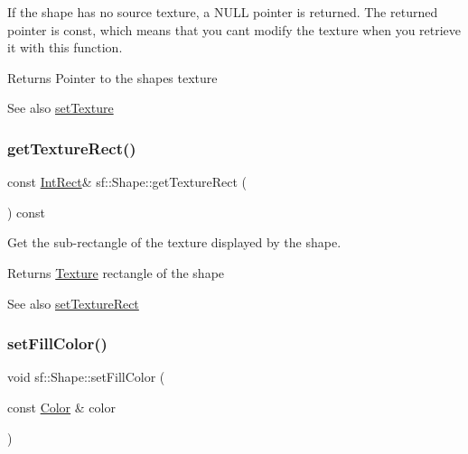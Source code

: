 If the shape has no source texture, a N\+U\+LL pointer is returned. The returned pointer is const, which means that you can\textquotesingle{}t modify the texture when you retrieve it with this function.

\begin{DoxyReturn}{Returns}
Pointer to the shape\textquotesingle{}s texture
\end{DoxyReturn}
\begin{DoxySeeAlso}{See also}
\hyperlink{classsf_1_1_shape_af8fb22bab1956325be5d62282711e3b6}{set\+Texture} 
\end{DoxySeeAlso}
\mbox{\label{classsf_1_1_shape_ac878aab03c230dc31c44e250d092b9ea}} 
\subsubsection{\texorpdfstring{get\+Texture\+Rect()}{getTextureRect()}}
{\footnotesize\ttfamily const \hyperlink{classsf_1_1_rect}{Int\+Rect}\& sf\+::\+Shape\+::get\+Texture\+Rect (\begin{DoxyParamCaption}{ }\end{DoxyParamCaption}) const}



Get the sub-\/rectangle of the texture displayed by the shape. 

\begin{DoxyReturn}{Returns}
\hyperlink{classsf_1_1_texture}{Texture} rectangle of the shape
\end{DoxyReturn}
\begin{DoxySeeAlso}{See also}
\hyperlink{classsf_1_1_shape_a2029cc820d1740d14ac794b82525e157}{set\+Texture\+Rect} 
\end{DoxySeeAlso}
\mbox{\label{classsf_1_1_shape_a3506f9b5d916fec14d583d16f23c2485}} 
\subsubsection{\texorpdfstring{set\+Fill\+Color()}{setFillColor()}}
{\footnotesize\ttfamily void sf\+::\+Shape\+::set\+Fill\+Color (\begin{DoxyParamCaption}\item[{const \hyperlink{classsf_1_1_color}{Color} \&}]{color }\end{DoxyParamCaption})}



